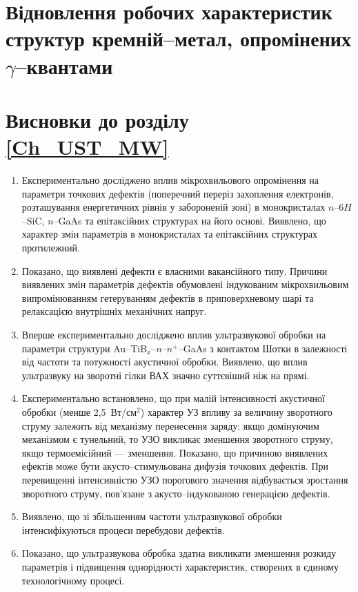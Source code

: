\documentclass[a4paper,14pt,oneside,openany]{memoir}
\begin{document}
\section{Відновлення робочих характеристик структур кремній--метал, опромінених $\gamma$--квантами}



\section*{Висновки до розділу \ref{Ch_UST_MW}}
  \begin{enumerate}
\item Експериментально досліджено вплив мікрохвильового опромінення на параметри точкових дефектів (поперечний переріз захоплення електронів,
розташування енергетичних рівнів у забороненій зоні) в монокристалах $n$--6$H$--SiC, $n$--GaAs та епітаксійних структурах на його основі.
Виявлено, що характер змін параметрів в монокристалах та епітаксійних структурах протилежний.

\item Показано, що виявлені дефекти є власними вакансійного типу.
Причини виявлених змін параметрів дефектів обумовлені індукованим мікрохвильовим випромінюванням гетеруванням дефектів в приповерхневому шарі та релаксацією внутрішніх механічних напруг.

     \item Вперше експериментально досліджено вплив ультразвукової обробки на параметри структури Au--TiB$_x$--$n$--$n^+$--GaAs з контактом Шотки
 в залежності від частоти та потужності акустичної обробки.
Виявлено, що вплив ультразвуку на зворотні гілки ВАХ значно суттєвіший ніж на прямі.

\item Експериментально встановлено, що при малій інтенсивності акустичної обробки (менше 2,5~Вт/см$^2$) характер УЗ впливу за величину зворотного струму залежить від механізму перенесення заряду:
  якщо домінуючим механізмом є тунельний, то УЗО викликає зменшення зворотного струму, якщо термоемісійний --- зменшення.
  Показано, що причиною виявлених ефектів може бути акусто--стимульована дифузія точкових дефектів.
  При перевищенні інтенсивністю УЗО порогового значення відбувається зростання зворотного струму, пов'язане з акусто--індукованою генерацією дефектів.

\item Виявлено, що зі збільшенням частоти ультразвукової обробки інтенсифікуються процеси перебудови дефектів.

\item Показано, що ультразвукова обробка здатна викликати зменшення розкиду параметрів і підвищення однорідності характеристик, створених в єдиному технологічному процесі.
 \end{enumerate}	
\end{document}
